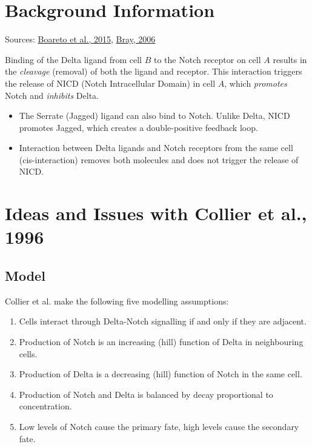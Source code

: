 \documentclass{article}
\begin{document}
\begin{flushleft}

\section{Background Information}

Sources: \href{https://www.pnas.org/doi/full/10.1073/pnas.1416287112}{Boareto et al., 2015}, \href{https://www.nature.com/articles/nrm2009}{Bray, 2006}

\medskip

Binding of the Delta ligand from cell $B$ to the Notch receptor on cell $A$ results in the \emph{cleavage} (removal) of both the ligand and receptor. This interaction triggers the release of NICD (Notch Intracellular Domain) in cell $A$, which \emph{promotes} Notch and \emph{inhibits} Delta.

\begin{itemize}
  \item The Serrate (Jagged) ligand can also bind to Notch. Unlike Delta, NICD promotes Jagged, which creates a double-positive feedback loop.
  \item Interaction between Delta ligands and Notch receptors from the same cell (cis-interaction) removes both molecules and does not trigger the release of NICD.
\end{itemize}

\section{Ideas and Issues with Collier et al., 1996}

\subsection{Model}

Collier et al. make the following five modelling assumptions:
\begin{enumerate}
  \item Cells interact through Delta-Notch signalling if and only if they are adjacent.
  \item Production of Notch is an increasing (hill) function of Delta in neighbouring cells.
  \item Production of Delta is a decreasing (hill) function of Notch in the same cell.
  \item Production of Notch and Delta is balanced by decay proportional to concentration.
  \item Low levels of Notch cause the primary fate, high levels cause the secondary fate.
\end{enumerate}


\end{flushleft}
\end{document}
